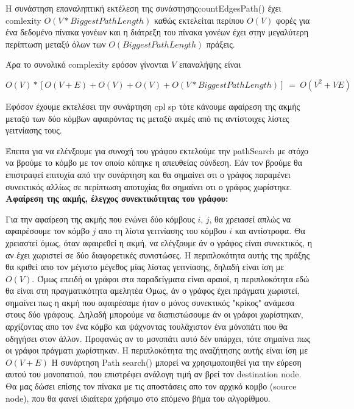 \documentclass{article}
\begin{document}
Η συνάστηση επαναληπτική εκτέλεση της συνάστησηςcountEdgesPath() έχει comlexity
$O(V*Biggest Path Length)$ καθώς εκτελείται περίπου $Ο(V)$ φορές για ένα δεδομένο πίνακα γονέων και η διάτρεξη του πίνακα γονέων έχει στην μεγαλύτερη περίπτωση μεταξύ όλων των $Ο(Biggest Path Length)$ πράξεις.\bigbreak

Άρα το συνολικό complexity εφόσον γίνονται $V$ επαναλήψης είναι 

$Ο(V) * [O(V+E)+O(V)+O(V)+Ο(V*Biggest Path Length)] \ = \ O(V^2 + VE)$\bigbreak

Eφόσον έχουμε εκτελέσει την συνάρτηση cpl sp τότε κάνουμε αφαίρεση της ακμής μεταξύ των δύο κόμβων αφαιρόντας τις μεταξύ ακμές από τις αντίστοιχες λίστες γειτνίασης τους.\bigbreak

Έπειτα για να ελένξουμε για συνοχή του γράφου εκτελούμε την pathSearch με στόχο να βρούμε το κόμβο με τον οποίο κόπηκε η απευθείας σύνδεση.
Εάν τον βρούμε θα επιστραφεί επιτυχία από την συνάρτηση και θα σημαίνει οτι ο γράφος παραμένει συνεκτικός αλλίως σε περίπτωση αποτυχίας θα σημαίνει οτι ο γράφος χωρίστηκε.\bigbreak
{}
\textbf{Αφαίρεση της ακμής, έλεγχος συνεκτικότητας του γράφου:}\bigbreak

Για την αφαίρεση της ακμής που ενώνει δύο κόμβους $i$, $j$, θα χρειασεί απλώς να αφαιρέσουμε τον κόμβο $j$ απο τη λίστα γειτνίασης του κόμβου $i$ και αντίστροφα.
Θα χρειαστεί όμως, όταν αφαιρεθεί η ακμή, να ελέγξουμε άν ο γράφος είναι συνεκτικός, η αν έχει χωριστεί σε δύο διαφορετικές συνιστώσες. Η περιπλοκότητα αυτής της
πράξης θα κριθεί απο τον μέγιστο μέγεθος μίας λίστας γειτνίασης, δηλαδή είναι ίση με $Ο(V)$. Όμως επειδή οι γράφοι στα παραδείγματα είναι αραιοί, η περιπλοκότητα 
εδώ θα είναι στη πραγματικότητα αμελητέα
Όμως, άν ο γράφος έχει πράγματι χωριστεί, σημαίνει πως η ακμή που αφαιρέσαμε ήταν ο μόνος συνεκτικός "κρίκος" ανάμεσα στους δύο γράφους.
Δηλαδή μπορούμε να διαπιστώσουμε άν οι γράφοι χωρίστηκαν, αρχίζοντας απο τον ένα κόμβο και ψάχνοντας τουλάχιστον ένα μόνοπάτι που θα οδηγήσει στον άλλον.
Προφανώς αν το μονοπάτι αυτό δέν υπάρχει, τότε σημαίνει πως οι γράφοι πράγματι χωρίστηκαν. Η περιπλοκότητα της αναζήτησης αυτής είναι ίση με $Ο(V + Ε)$
Η συνάρτηση Path search() μπορεί να χρησιμοποιηθεί για την εύρεση αυτού του μονοπατιού, που επιστρέφει ανάλογη τιμή αν
βρεί τον destination node. Θα μας δώσει επίσης τον πίνακα με τις αποστάσεις απο τον αρχικό κομβο 
(source node), που θα φανεί ιδιαίτερα χρήσιμο στο επόμενο βήμα του αλγορίθμου.\bigbreak
\end{document}
